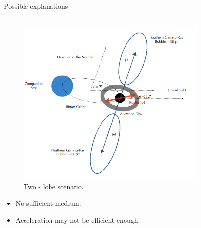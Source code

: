 \documentclass[10pt,aspectratio=169,mathserif]{beamer}
\begin{document}
\begin{frame}{Possible explanations}
 \begin{columns}[T] %
    \begin{column}{0.5\textwidth} 
        \begin{figure}
        \centering
        \includegraphics[scale=0.4]{Alfaro.png}
        \caption{Two - lobe scenario. \citep{alfaro2024ultra}}
        \label{fig:confine}
        \end{figure}
        \begin{itemize}
            \item No sufficient medium.
            \item Acceleration may not be efficient enough.
        \end{itemize}
    \end{column}
    \begin{column}{0.5\textwidth} %
        \begin{figure}
        \centering

\end{figure}
\end{column}
\end{columns}
\end{frame}
\end{document}
